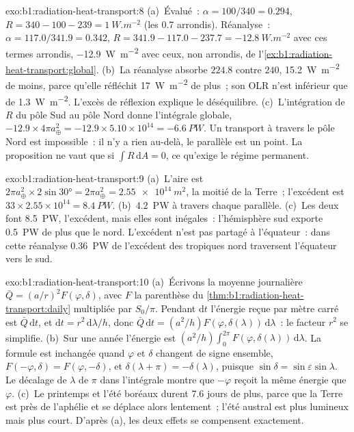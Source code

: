 \begin{solution}{exo:b1:radiation-heat-transport:8}
(a)~Évalué~: $\alpha = 100/340 = 0.294$, $R = 340 - 100 - 239 =
\qty{+1}{W.m^{-2}}$ (les \num{0.7} arrondis). Réanalyse~: $\alpha = 117.0/341.9 =
0.342$, $R = 341.9 - 117.0 - 237.7 = \qty{-12.8}{W.m^{-2}}$ avec ces termes arrondis,
\qty{-12.9}{W.m^{-2}} avec ceux, non arrondis, de
l'\cref{ex:b1:radiation-heat-transport:global}. (b)~La réanalyse
absorbe $224.8$ contre $240$, \qty{15.2}{W.m^{-2}} de moins, parce qu'elle réfléchit
\qty{17}{W.m^{-2}} de plus~; son OLR n'est inférieur que de \qty{1.3}{W.m^{-2}}. L'excès
de réflexion explique le déséquilibre. (c)~L'intégration de $R$ du pôle Sud au pôle
Nord donne l'intégrale globale, $-12.9 \times 4\pi a_\oplus^2 = -12.9 \times
5.10\times10^{14} = \qty{-6.6}{PW}$. Un transport à travers le pôle Nord est
impossible~: il n'y a rien au-delà, le parallèle est un point. La proposition
ne vaut que si $\int R\,\mathrm dA = 0$, ce qu'exige le régime permanent.
\end{solution}

\begin{solution}{exo:b1:radiation-heat-transport:9}
(a)~L'aire est $2\pi a_\oplus^2 \times 2\sin\ang{30} = 2\pi a_\oplus^2 =
\qty{2.55e14}{m^2}$, la moitié de la Terre~; l'excédent est $33 \times 2.55\times10^{14} =
\qty{8.4}{PW}$. (b)~\qty{4.2}{PW} à travers chaque parallèle. (c)~Les deux font
\qty{8.5}{PW}, l'excédent, mais elles sont inégales~: l'hémisphère sud exporte
\qty{0.5}{PW} de plus que le nord. L'excédent n'est pas partagé à
l'équateur~: dans cette réanalyse \qty{0.36}{PW} de l'excédent des tropiques nord traversent
l'équateur vers le sud.
\end{solution}

\begin{solution}{exo:b1:radiation-heat-transport:10}
(a)~Écrivons la moyenne journalière $\bar Q = (a/r)^2 F(\varphi, \delta)$, avec $F$ la
parenthèse du \cref{thm:b1:radiation-heat-transport:daily} multipliée par $S_0/\pi$. Pendant
$\mathrm dt$ l'énergie reçue par mètre carré est $\bar Q\,\mathrm dt$, et
$\mathrm dt = r^2\,\mathrm d\lambda/h$, donc $\bar Q\,\mathrm dt = (a^2/h)
F(\varphi, \delta(\lambda))\,\mathrm d\lambda$~: le facteur $r^2$ se simplifie.
(b)~Sur une année l'énergie est $(a^2/h)\int_0^{2\pi} F(\varphi,
\delta(\lambda))\,\mathrm d\lambda$. La formule est inchangée quand $\varphi$ et
$\delta$ changent de signe ensemble, $F(-\varphi, \delta) = F(\varphi, -\delta)$, et
$\delta(\lambda + \pi) = -\delta(\lambda)$, puisque $\sin\delta = \sin\varepsilon
\sin\lambda$. Le décalage de $\lambda$ de $\pi$ dans l'intégrale montre que $-\varphi$
reçoit la même énergie que $\varphi$. (c)~Le printemps et l'été boréaux durent
\num{7.6} jours de plus, parce que la Terre est près de l'aphélie et se déplace alors lentement~;
l'été austral est plus lumineux mais plus court. D'après (a), les deux effets se compensent exactement.
\end{solution}

